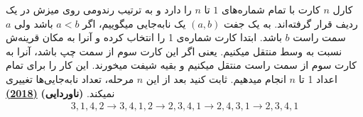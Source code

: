 کارل $n$ کارت با تمام شماره‌های $1$ تا $n$ را دارد و به ترتیب رندومی روی میزش در یک ردیف قرار گرفته‌اند.
به یک جفت $(a, b)$ یک نابه‌جایی میگوییم، اگر $a < b$ باشد ولی $a$ سمت راست $b$ باشد.
ابتدا کارت شماره‌ی 1 را انتخاب کرده و آنرا به مکان قرینه‌ش نسبت به وسط منتقل میکنیم.
یعنی اگر این کارت سوم از سمت چپ باشد، آنرا به کارت سوم از سمت راست منتقل میکنیم و بقیه شیفت میخورند.
این کار را برای تمام اعداد 1 تا $n$ انجام میدهیم.
ثابت کنید بعد از این $n$ مرحله، تعداد نابه‌جایی‌ها تغییری نمیکند.
\textbf{(ناوردایی)}
\href{https://artofproblemsolving.com/community/c5h1630186p10232393}{\textbf{(2018)}}
\begin{gather*}
    3,1,4,2\to 3,4,1,2\to 2,3,4,1\to 2,4,3,1\to 2,3,4,1
\end{gather*}
